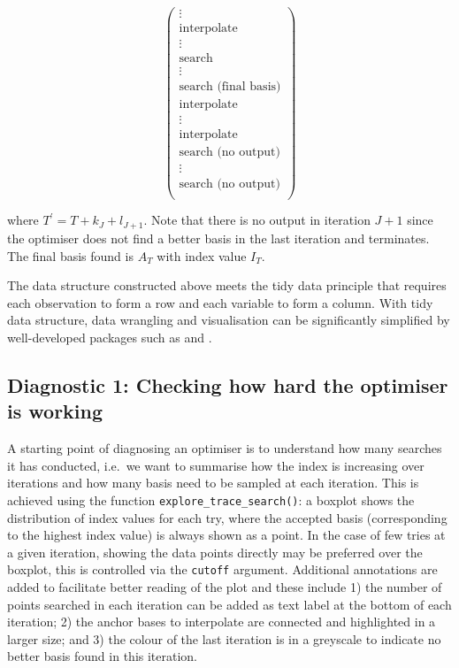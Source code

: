 \begin{equation}
\begin{pmatrix}
\vdots \\
\text{interpolate} \\
\hline
\vdots \\
\hline
\text{search} \\
\vdots \\
\text{search (final basis)} \\
\hline
\text{interpolate} \\
\vdots \\
\text{interpolate} \\
\hline
\text{search (no output)} \\
\vdots \\
\text{search (no output)} \\
\end{pmatrix}
\label{eq:data-structure}
\end{equation}

\noindent where \(T^{\prime} = T + k_{J}+ l_{J+1}\). Note that there is
no output in iteration \(J + 1\) since the optimiser does not find a
better basis in the last iteration and terminates. The final basis found
is \(A_T\) with index value \(I_T\).

The data structure constructed above meets the tidy data principle
\citep{wickham2014tidy} that requires each observation to form a row and
each variable to form a column. With tidy data structure, data wrangling
and visualisation can be significantly simplified by well-developed
packages such as  \citep{dplyr} and 
\citep{ggplot2}.

\hypertarget{diagnostic-1-checking-how-hard-the-optimiser-is-working}{%
\subsection{Diagnostic 1: Checking how hard the optimiser is
working}\label{diagnostic-1-checking-how-hard-the-optimiser-is-working}}

A starting point of diagnosing an optimiser is to understand how many
searches it has conducted, i.e.~we want to summarise how the index is
increasing over iterations and how many basis need to be sampled at each
iteration. This is achieved using the function
\texttt{explore\_trace\_search()}: a boxplot shows the distribution of
index values for each try, where the accepted basis (corresponding to
the highest index value) is always shown as a point. In the case of few
tries at a given iteration, showing the data points directly may be
preferred over the boxplot, this is controlled via the \texttt{cutoff}
argument. Additional annotations are added to facilitate better reading
of the plot and these include 1) the number of points searched in each
iteration can be added as text label at the bottom of each iteration; 2)
the anchor bases to interpolate are connected and highlighted in a
larger size; and 3) the colour of the last iteration is in a greyscale
to indicate no better basis found in this iteration.

